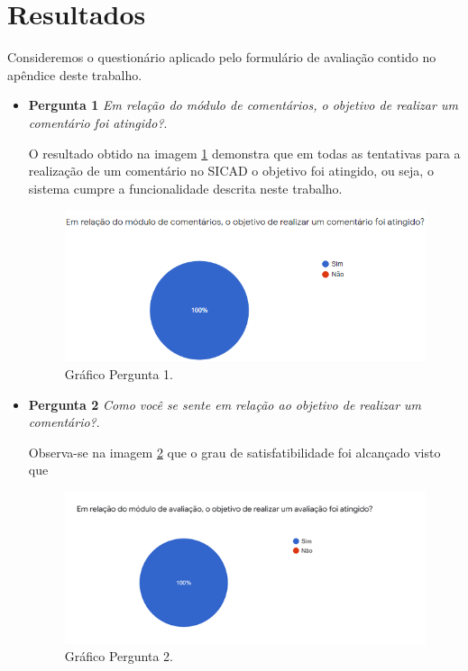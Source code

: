 \documentclass[12pt, a4paper]{report}
\begin{document}
\section{Resultados} 
Consideremos o questionário aplicado pelo formulário de avaliação contido no apêndice deste trabalho. 
\begin{itemize}
\item{\textbf{ Pergunta 1}}
\textit{Em relação do módulo de comentários, o objetivo de realizar um comentário foi atingido?}.

O resultado obtido na imagem \ref{fig:grafico_pergunta1} demonstra que em todas as tentativas para a realização de um comentário no SICAD o objetivo foi atingido, ou seja, o sistema cumpre a funcionalidade descrita neste trabalho.

\begin{figure}
\centering
\includegraphics[scale=1.0]{grafico_pergunta1.png}
\caption{Gráfico Pergunta 1.}
\label{fig:grafico_pergunta1}
\end{figure}

\item{\textbf{ Pergunta 2}}
\textit{Como você se sente em relação ao objetivo de realizar um comentário?}.

Observa-se na imagem \ref{fig:grafico_pergunta2} que o grau de satisfatibilidade foi alcançado visto que   
\begin{figure}
\centering
\includegraphics[scale=1.0]{grafico_pergunta2.png}
\caption{Gráfico Pergunta 2.}
\label{fig:grafico_pergunta2}
\end{figure}


\end{itemize}
\end{document}
